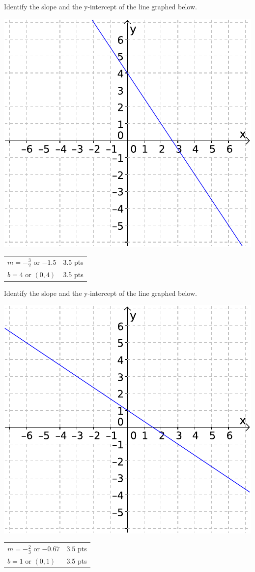 {
	Identify the slope and the y-intercept of the line graphed below.
	\begin{center}\includegraphics{fig095-11-a}\end{center}
}
{
	\begin{tabular}{l r}
	$m=-\frac{3}{2}$ or $-1.5$ & $3.5$ pts\\
	$b=4$ or $(0,4)$ & 3.5 pts
	\end{tabular}
}

{
	Identify the slope and the y-intercept of the line graphed below.
	\begin{center}\includegraphics{fig095-11-b}\end{center}
}
{
	\begin{tabular}{l r}
	$m=-\frac{2}{3}$ or $-0.67$ & $3.5$ pts\\
	$b=1$ or $(0,1)$ & 3.5 pts
	\end{tabular}
}

